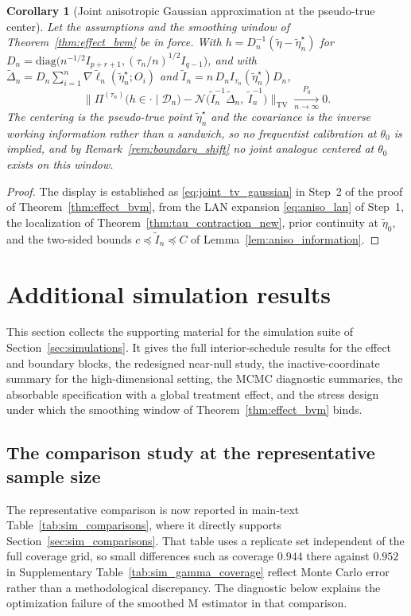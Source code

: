 \documentclass[11pt]{article}
\newtheorem{corollary}{Corollary}
\theoremstyle{definition}
\theoremstyle{plain}
\begin{document}
\begin{corollary}[Joint anisotropic Gaussian approximation at the pseudo-true center]
\label{cor:joint_bvm}
Let the assumptions and the smoothing window of Theorem~\ref{thm:effect_bvm} be in force. With $h=D_n^{-1}(\tilde\eta-\tilde\eta_n^\star)$ for $D_n=\mathrm{diag}\big(n^{-1/2}I_{p+r+1},(\tau_n/n)^{1/2}I_{q-1}\big)$, and with $\tilde\Delta_n=D_n\sum_{i=1}^n\nabla\tilde\ell_n(\tilde\eta_n^\star;O_i)$ and $\tilde I_n=n\,D_nI_{\tau_n}(\tilde\eta_n^\star)D_n$,
\[
\big\|\Pi^{(\tau_n)}\big(h\in\cdot\mid\mathcal D_n\big)-\mathcal N\big(\tilde I_n^{-1}\tilde\Delta_n,\ \tilde I_n^{-1}\big)\big\|_{\mathrm{TV}}\xrightarrow[n\to\infty]{P_0}0 .
\]
The centering is the pseudo-true point $\tilde\eta_n^\star$ and the covariance is the inverse working information rather than a sandwich, so no frequentist calibration at $\theta_0$ is implied, and by Remark~\ref{rem:boundary_shift} no joint analogue centered at $\theta_0$ exists on this window.
\end{corollary}

\begin{proof}
The display is established as \eqref{eq:joint_tv_gaussian} in Step~2 of the proof of Theorem~\ref{thm:effect_bvm}, from the LAN expansion \eqref{eq:aniso_lan} of Step~1, the localization of Theorem~\ref{thm:tau_contraction_new}, prior continuity at $\tilde\eta_0$, and the two-sided bounds $c\preceq\tilde I_n\preceq C$ of Lemma~\ref{lem:aniso_information}.
\end{proof}
\section{Additional simulation results}
\label{sec:additional_simulation}

This section collects the supporting material for the simulation suite of Section~\ref{sec:simulations}. It gives the full interior-schedule results for the effect and boundary blocks, the redesigned near-null study, the inactive-coordinate summary for the high-dimensional setting, the MCMC diagnostic summaries, the absorbable specification with a global treatment effect, and the stress design under which the smoothing window of Theorem~\ref{thm:effect_bvm} binds.

\subsection{The comparison study at the representative sample size}

The representative comparison is now reported in main-text Table~\ref{tab:sim_comparisons}, where it directly supports Section~\ref{sec:sim_comparisons}. That table uses a replicate set independent of the full coverage grid, so small differences such as coverage $0.944$ there against $0.952$ in Supplementary Table~\ref{tab:sim_gamma_coverage} reflect Monte Carlo error rather than a methodological discrepancy. The diagnostic below explains the optimization failure of the smoothed M estimator in that comparison.
\end{document}
